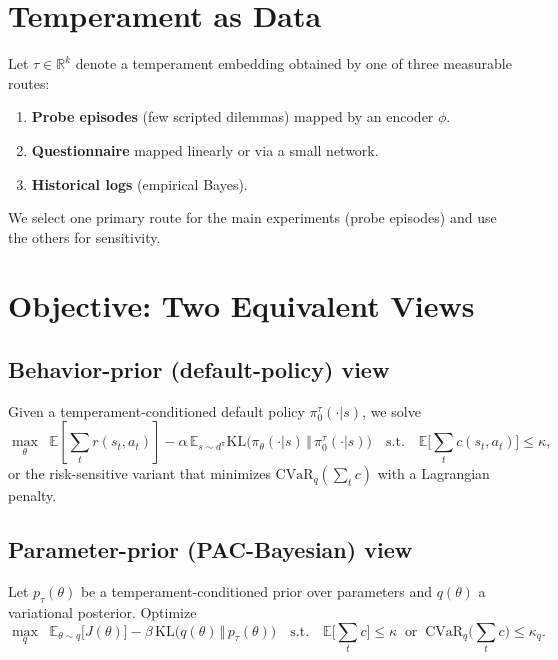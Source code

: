 \documentclass[10pt]{article}
\theoremstyle{plain}
\theoremstyle{definition}
\theoremstyle{remark}
\newcommand{\E}{\mathbb{E}}
\newcommand{\R}{\mathbb{R}}
\newcommand{\1}{\mathds{1}}
\newcommand{\KL}{\mathrm{KL}}
\newcommand{\cvar}{\mathrm{CVaR}}
\begin{document}
\section{Temperament as Data}
\label{sec:temperament}
Let $\tau\in\R^k$ denote a temperament embedding obtained by one of three measurable routes:
\begin{enumerate}[leftmargin=1.5em,itemsep=2pt,topsep=2pt]
    \item \textbf{Probe episodes} (few scripted dilemmas) mapped by an encoder $\phi$.
    \item \textbf{Questionnaire} mapped linearly or via a small network.
    \item \textbf{Historical logs} (empirical Bayes).
\end{enumerate}
We select one primary route for the main experiments (probe episodes) and use the others for sensitivity.

\section{Objective: Two Equivalent Views}
\label{sec:objective}

\subsection{Behavior-prior (default-policy) view}
Given a temperament-conditioned default policy $\pi_0^\tau(\cdot|s)$, we solve
\begin{equation}
\label{eq:behav}
\max_{\theta}\;\; \E\!\left[\sum_{t} r(s_t,a_t)\right]
-\alpha \,\E_{s\sim d^\pi} \KL\!\big(\pi_\theta(\cdot|s)\,\Vert\,\pi_0^\tau(\cdot|s)\big)
\quad \text{s.t.}\quad \E\!\Big[\sum_t c(s_t,a_t)\Big]\le \kappa,
\end{equation}
or the risk-sensitive variant that minimizes $\cvar_q(\sum_t c)$ with a Lagrangian penalty.

\subsection{Parameter-prior (PAC-Bayesian) view}
Let $p_\tau(\theta)$ be a temperament-conditioned prior over parameters and $q(\theta)$ a variational posterior. Optimize
\begin{equation}
\label{eq:param}
\max_{q}\;\; \E_{\theta\sim q}\Big[J(\theta)\Big] - \beta \,\KL\!\big(q(\theta)\,\Vert\,p_\tau(\theta)\big)
\quad \text{s.t.}\quad \E\!\Big[\sum_t c\Big]\le \kappa \;\;\text{or}\;\; \cvar_q\Big(\sum_t c\Big)\le \kappa_q.
\end{equation}
\end{document}
